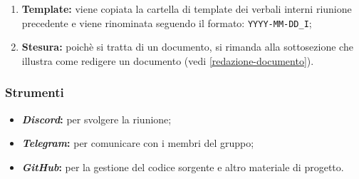 \begin{itemize}
\begin{enumerate}
		      \item \textbf{Template:} viene copiata la cartella di template dei
		            verbali interni riunione precedente e viene rinominata
		            seguendo il formato: \texttt{YYYY-MM-DD\_I};

		      \item \textbf{Stesura:} poichè si tratta di un documento, si
		            rimanda alla sottosezione che illustra come redigere un
		            documento (vedi \autoref{redazione-documento}).
	      \end{enumerate}
\end{itemize}

\subsubsection{Strumenti}
\begin{itemize}
	\item \textbf{\textit{Discord}:} per svolgere la riunione;
	\item \textbf{\textit{Telegram}:} per comunicare con i membri del gruppo;
	\item \textbf{\textit{GitHub}:} per la gestione del codice sorgente e altro
	      materiale di progetto.
\end{itemize}
